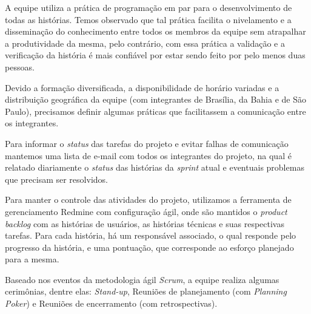 
A equipe utiliza a prática de programação em par para o desenvolvimento de todas as histórias. Temos observado que tal prática facilita o nivelamento e a disseminação do conhecimento entre todos os membros da equipe sem atrapalhar a produtividade da mesma, pelo contrário, com essa prática a validação e a verificação da história é mais confiável por estar sendo feito por pelo menos duas pessoas.


Devido a formação diversificada, a disponibilidade de horário variadas e a distribuição geográfica da equipe (com integrantes de Brasília, da Bahia e de São Paulo), precisamos definir algumas práticas que facilitassem a comunicação entre os integrantes. 

Para informar o \textit{status} das tarefas do projeto e evitar falhas de comunicação mantemos uma lista de e-mail com todos os integrantes do projeto, na qual é relatado diariamente o \textit{status} das histórias da \textit{sprint} atual e eventuais problemas que precisam ser resolvidos. 

Para manter o controle das atividades do projeto, utilizamos a ferramenta de gerenciamento Redmine com configuração ágil, onde são mantidos o \textit{product backlog} com as histórias de usuários, as histórias técnicas e suas respectivas tarefas. Para cada história, há um responsável associado, o qual responde pelo progresso da história, e uma pontuação, que corresponde ao esforço planejado para a mesma.


Baseado nos eventos da metodologia ágil \textit{Scrum}, a equipe realiza algumas cerimônias, dentre elas: \textit{Stand-up}, Reuniões de planejamento (com \textit{Planning Poker}) e Reuniões de encerramento (com retrospectivas).


